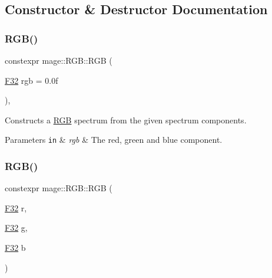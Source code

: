 \subsection{Constructor \& Destructor Documentation}
\hypertarget{structmage_1_1_r_g_b_a166d2c13b46f9518c132c68f1117e5c6}{}\label{structmage_1_1_r_g_b_a166d2c13b46f9518c132c68f1117e5c6} 
\subsubsection{\texorpdfstring{R\+G\+B()}{RGB()}\hspace{0.1cm}{\footnotesize\ttfamily [1/7]}}
{\footnotesize\ttfamily constexpr mage\+::\+R\+G\+B\+::\+R\+GB (\begin{DoxyParamCaption}\item[{\hyperlink{namespacemage_aa97e833b45f06d60a0a9c4fc22ae02c0}{F32}}]{rgb = {\ttfamily 0.0f} }\end{DoxyParamCaption})\hspace{0.3cm}{\ttfamily [explicit]}, {\ttfamily [noexcept]}}

Constructs a \hyperlink{structmage_1_1_r_g_b}{R\+GB} spectrum from the given spectrum components.


\begin{DoxyParams}[1]{Parameters}
\mbox{\tt in}  & {\em rgb} & The red, green and blue component. \\
\hline
\end{DoxyParams}
\hypertarget{structmage_1_1_r_g_b_af4304d8dc009f1b551442d6ebd15c0fa}{}\label{structmage_1_1_r_g_b_af4304d8dc009f1b551442d6ebd15c0fa} 
\subsubsection{\texorpdfstring{R\+G\+B()}{RGB()}\hspace{0.1cm}{\footnotesize\ttfamily [2/7]}}
{\footnotesize\ttfamily constexpr mage\+::\+R\+G\+B\+::\+R\+GB (\begin{DoxyParamCaption}\item[{\hyperlink{namespacemage_aa97e833b45f06d60a0a9c4fc22ae02c0}{F32}}]{r,  }\item[{\hyperlink{namespacemage_aa97e833b45f06d60a0a9c4fc22ae02c0}{F32}}]{g,  }\item[{\hyperlink{namespacemage_aa97e833b45f06d60a0a9c4fc22ae02c0}{F32}}]{b }\end{DoxyParamCaption})\hspace{0.3cm}{\ttfamily [noexcept]}}

